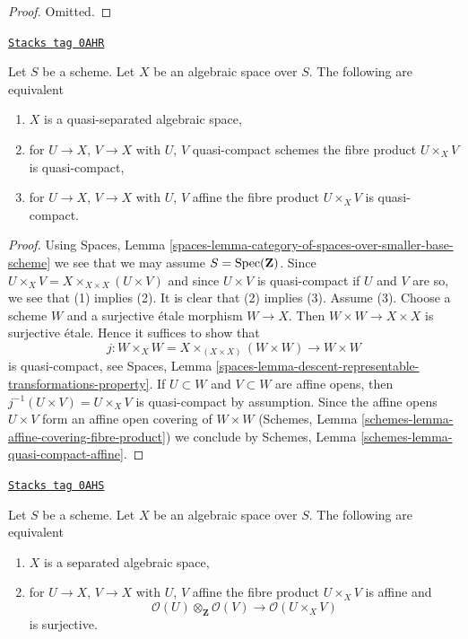 \begin{proof}
Omitted.
\end{proof}

\begin{lemma}
\label{spaces-properties-lemma-characterize-quasi-separated}
\href{https://stacks.math.columbia.edu/tag/0AHR}{\texttt{Stacks tag 0AHR}}

Let $S$ be a scheme. Let $X$ be an algebraic space over $S$.
The following are equivalent
\begin{enumerate}
\item $X$ is a quasi-separated algebraic space,
\item for $U \to X$, $V \to X$ with $U$, $V$ quasi-compact schemes
the fibre product $U \times_X V$ is quasi-compact,
\item for $U \to X$, $V \to X$ with $U$, $V$ affine
the fibre product $U \times_X V$ is quasi-compact.
\end{enumerate}
\end{lemma}

\begin{proof}
Using Spaces, Lemma
\ref{spaces-lemma-category-of-spaces-over-smaller-base-scheme}
we see that we may assume $S = \operatorname{Spec}(\mathbf{Z})$.
Since $U \times_X V = X \times_{X \times X} (U \times V)$
and since $U \times V$ is quasi-compact if $U$ and $V$ are so,
we see that (1) implies (2). It is clear that (2) implies (3).
Assume (3). Choose a scheme $W$ and a surjective \'etale morphism
$W \to X$. Then $W \times W \to X \times X$ is surjective \'etale.
Hence it suffices to show that
$$
j : W \times_X W = X \times_{(X \times X)} (W \times W) \to W \times W
$$
is quasi-compact, see Spaces, Lemma
\ref{spaces-lemma-descent-representable-transformations-property}.
If $U \subset W$ and $V \subset W$ are affine opens, then
$j^{-1}(U \times V) = U \times_X V$ is quasi-compact by assumption.
Since the affine opens $U \times V$ form an affine open covering of
$W \times W$ (Schemes, Lemma \ref{schemes-lemma-affine-covering-fibre-product})
we conclude by
Schemes, Lemma \ref{schemes-lemma-quasi-compact-affine}.
\end{proof}

\begin{lemma}
\label{spaces-properties-lemma-characterize-separated}
\href{https://stacks.math.columbia.edu/tag/0AHS}{\texttt{Stacks tag 0AHS}}

Let $S$ be a scheme. Let $X$ be an algebraic space over $S$.
The following are equivalent
\begin{enumerate}
\item $X$ is a separated algebraic space,
\item for $U \to X$, $V \to X$ with $U$, $V$ affine
the fibre product $U \times_X V$ is affine and
$$
\mathcal{O}(U) \otimes_\mathbf{Z} \mathcal{O}(V)
\longrightarrow
\mathcal{O}(U \times_X V)
$$
is surjective.
\end{enumerate}
\end{lemma}

